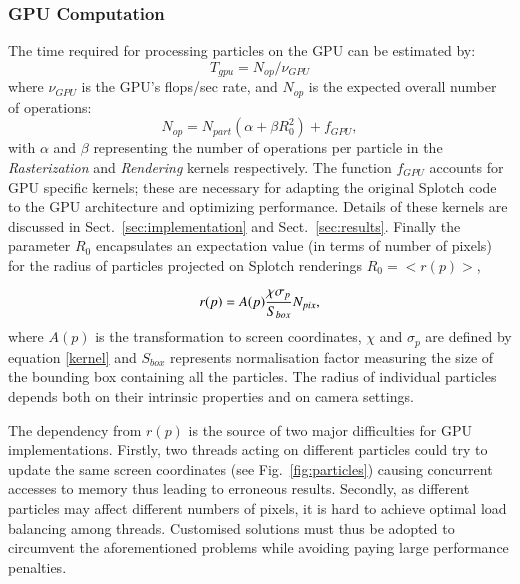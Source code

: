 \documentclass[preprint,5pt]{elsarticle}
\begin{document}
\subsubsection{GPU Computation}
The time required for processing particles on the GPU can be estimated by:
\begin{equation}
T_{gpu} = N_{op}/\nu_{GPU}
\end{equation}
where $\nu_{GPU}$ is the GPU's flops/sec rate, and $N_{op}$ is the expected overall number of operations:
\begin{equation}\label{ops}
N_{op} = N_{part}(\alpha + \beta R_0^2) + f_{GPU},
\end{equation}
with $\alpha$ and $\beta$ representing the number of operations per particle in the \textit{Rasterization} and \textit{Rendering} kernels respectively.
The function $f_{GPU}$ accounts for GPU specific kernels; these are necessary for adapting the original Splotch code to the GPU architecture and optimizing performance. Details of these kernels are discussed in Sect.~\ref{sec:implementation} and Sect.~\ref{sec:results}.
Finally the parameter $R_0$ encapsulates an expectation value (in terms of number of pixels) for the radius of particles projected on Splotch renderings $R_0 = <r(p)>$,

\begin{equation}\label{radius}
r(p) = A(p){\chi \sigma_p\over S_{box}} N_{pix},
\end{equation} 
where $A(p)$ is the transformation to screen coordinates, $\chi$ and $\sigma_p$ are defined by equation \eqref{kernel} and $S_{box}$ represents 
normalisation factor measuring the size of the bounding box containing all the particles.
The radius of individual particles depends both on their intrinsic properties and on camera settings. %

The dependency from $r(p)$ is the source of two major difficulties for GPU implementations. Firstly, two threads acting on different particles could try 
to update the same screen coordinates (see Fig.~\ref{fig:particles}) causing concurrent accesses to memory thus leading to erroneous results. 
Secondly, as different particles may affect different numbers of pixels, it is hard to achieve optimal load balancing among threads.  
Customised solutions must thus be adopted to circumvent the aforementioned problems while avoiding paying large performance penalties. 
\end{document}
